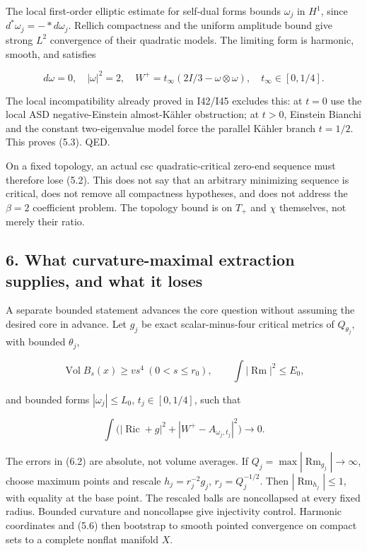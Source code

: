 \documentclass[
  10pt,
]{article}
\begin{document}
The local first-order elliptic estimate for self-dual forms bounds
\(\omega_j\) in \(H^1\), since \(d^*\omega_j=-*d\omega_j\). Rellich
compactness and the uniform amplitude bound give strong \(L^2\)
convergence of their quadratic models. The limiting form is harmonic,
smooth, and satisfies

\[
 d\omega=0,\quad |\omega|^2=2,\quad
 W^+=t_\infty(2I/3-\omega\otimes\omega),
 \quad t_\infty\in[0,1/4].
\]

The local incompatibility already proved in I42/I45 excludes this: at
\(t=0\) use the local ASD negative-Einstein almost-Kähler obstruction;
at \(t>0\), Einstein Bianchi and the constant two-eigenvalue model force
the parallel Kähler branch \(t=1/2\). This proves (5.3). QED.

On a fixed topology, an actual csc quadratic-critical zero-end sequence
must therefore lose (5.2). This does not say that an arbitrary
minimizing sequence is critical, does not remove all compactness
hypotheses, and does not address the \(\beta=2\) coefficient problem.
The topology bound is on \(T_+\) and \(\chi\) themselves, not merely
their ratio.

\hypertarget{what-curvature-maximal-extraction-supplies-and-what-it-loses}{%
\subsection{6. What curvature-maximal extraction supplies, and what it
loses}\label{what-curvature-maximal-extraction-supplies-and-what-it-loses}}

A separate bounded statement advances the core question without assuming
the desired core in advance. Let \(g_j\) be exact scalar-minus-four
critical metrics of \(Q_{\theta_j}\), with bounded \(\theta_j\),

\[
 \operatorname{Vol}B_s(x)\ge v s^4\ (0<s\le r_0),\qquad
 \int|\operatorname{Rm}|^2\le E_0,                            \tag{6.1}
\]

and bounded forms \(|\omega_j|\le L_0\), \(t_j\in[0,1/4]\), such that

\[
 \int\bigl(|\operatorname{Ric}+g|^2+
                      |W^+-A_{\omega_j,t_j}|^2\bigr)\to0.     \tag{6.2}
\]

The errors in (6.2) are absolute, not volume averages. If
\(Q_j=\max|\operatorname{Rm}_{g_j}|\to\infty\), choose maximum points
and rescale \(h_j=r_j^{-2}g_j\), \(r_j=Q_j^{-1/2}\). Then
\(|\operatorname{Rm}_{h_j}|\le1\), with equality at the base point. The
rescaled balls are noncollapsed at every fixed radius. Bounded curvature
and noncollapse give injectivity control. Harmonic coordinates and (5.6)
then bootstrap to smooth pointed convergence on compact sets to a
complete nonflat manifold \(X\).
\end{document}
